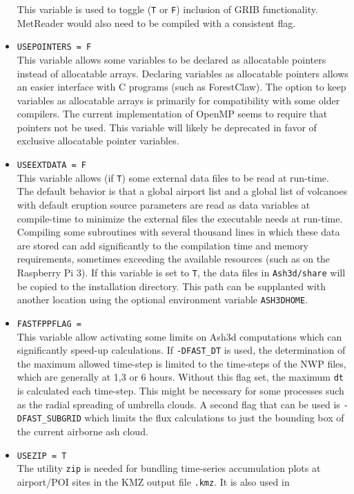 \begin{itemize}
This variable is used to toggle (\texttt{T} or \texttt{F}) inclusion of GRIB
functionality.  MetReader would also need to be compiled with a consistent flag.
 \item \texttt{USEPOINTERS = F}\\
This variable allows some variables to be declared as allocatable pointers instead
of allocatable arrays.  Declaring variables as allocatable pointers allows an easier
interface with C programs (such as ForestClaw).  The option to keep variables as
allocatable arrays is primarily for compatibility with some older compilers.  The
current implementation of OpenMP seems to require that pointers not be used.
This variable
will likely be deprecated in favor of exclusive allocatable pointer variables.
 \item \texttt{USEEXTDATA = F}\\
This variable allows (if \texttt{T}) some external data files to be read at run-time.
The default behavior is that a global airport list and a global list of volcanoes with
default eruption source parameters are read as data variables at compile-time
to minimize the external files the executable needs at run-time.  Compiling
some subroutines with several thousand lines in which these data are stored can add
significantly to the compilation time and memory requirements, sometimes exceeding
the available resources (such as on the Raspberry Pi 3).  If this variable is set to
\texttt{T}, the data files in \texttt{Ash3d/share} will be copied to the installation
directory.  This path can be supplanted with another location using the optional
environment variable \texttt{ASH3DHOME}.
 \item \texttt{FASTFPPFLAG = }\\
This variable allow activating some limits on Ash3d computations which can significantly
speed-up calculations.  If \texttt{-DFAST\_DT} is used, the determination of the
maximum allowed time-step is limited to the time-steps of the NWP files, which are
generally at 1,3 or 6 hours.  Without this flag set, the maximum \texttt{dt} is
calculated each time-step.  This might be necessary for some processes such as
the radial spreading of umbrella clouds.  A second flag that can be used is
\texttt{-DFAST\_SUBGRID} which limits the flux calculations to just the bounding
box of the current airborne ash cloud.
 \item \texttt{USEZIP = T}\\
The utility \texttt{zip} is needed for bundling time-series accumulation plots
at airport/POI sites in the KMZ output file \texttt{.kmz}. It is also used in

\end{itemize}
